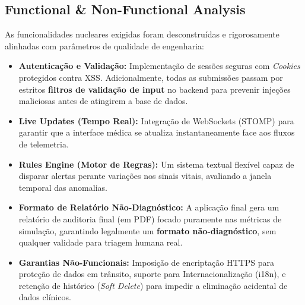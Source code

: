 \documentclass[11pt,a4paper]{article}
\begin{document}
\subsection{Functional \& Non-Functional Analysis}
As funcionalidades nucleares exigidas foram desconstruídas e rigorosamente alinhadas com parâmetros de qualidade de engenharia:
\begin{itemize}[label=\color{accentblue}\bullet]
    \item \textbf{Autenticação e Validação:} Implementação de sessões seguras com \textit{Cookies} protegidos contra XSS. Adicionalmente, todas as submissões passam por estritos \textbf{filtros de validação de input} no backend para prevenir injeções maliciosas antes de atingirem a base de dados.
    \item \textbf{Live Updates (Tempo Real):} Integração de WebSockets (STOMP) para garantir que a interface médica se atualiza instantaneamente face aos fluxos de telemetria.
    \item \textbf{Rules Engine (Motor de Regras):} Um sistema textual flexível capaz de disparar alertas perante variações nos sinais vitais, avaliando a janela temporal das anomalias.
    \item \textbf{Formato de Relatório Não-Diagnóstico:} A aplicação final gera um relatório de auditoria final (em PDF) focado puramente nas métricas de simulação, garantindo legalmente um \textbf{formato não-diagnóstico}, sem qualquer validade para triagem humana real.
    \item \textbf{Garantias Não-Funcionais:} Imposição de encriptação HTTPS para proteção de dados em trânsito, suporte para Internacionalização (i18n), e retenção de histórico (\textit{Soft Delete}) para impedir a eliminação acidental de dados clínicos.
\end{itemize}
\end{document}
